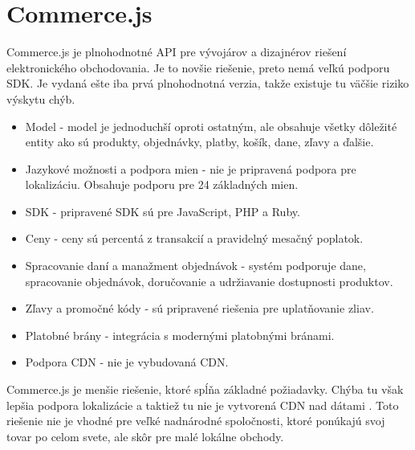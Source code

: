 \documentclass[
  printed, %
  table,   %
  lof,     %
  nolot,     %
  twoside,  
]{fithesis3}
\begin{document}
\section{Commerce.js}
Commerce.js je plnohodnotné API pre vývojárov a dizajnérov riešení elektronického obchodovania. Je to novšie riešenie, preto nemá veľkú podporu SDK. Je vydaná ešte iba prvá plnohodnotná verzia, takže existuje tu väčšie riziko výskytu chýb.
\begin{itemize}
	\item Model - model je jednoduchší oproti ostatným, ale obsahuje všetky dôležité entity ako sú produkty, objednávky, platby, košík, dane, zľavy a ďalšie. 
	\item Jazykové možnosti a podpora mien - nie je pripravená podpora pre lokalizáciu. Obsahuje podporu pre 24 základných mien.
	\item SDK - pripravené SDK sú pre JavaScript, PHP a Ruby.
	\item Ceny - ceny sú percentá z transakcií a pravidelný mesačný poplatok.
	\item Spracovanie daní a manažment objednávok - systém podporuje dane, spracovanie objednávok, doručovanie a udržiavanie dostupnosti produktov. 
	\item Zľavy a promočné kódy - sú pripravené riešenia pre uplatňovanie zliav.
	\item Platobné brány - integrácia s modernými platobnými bránami.
	\item Podpora CDN - nie je vybudovaná CDN.
\end{itemize}
Commerce.js je menšie riešenie, ktoré spĺňa základné požiadavky. Chýba tu však lepšia podpora lokalizácie a taktiež tu nie je vytvorená CDN nad dátami \cite{Commerce.js}. Toto riešenie nie je vhodné pre veľké nadnárodné spoločnosti, ktoré ponúkajú svoj tovar po celom svete, ale skôr pre malé lokálne obchody.
\end{document}
